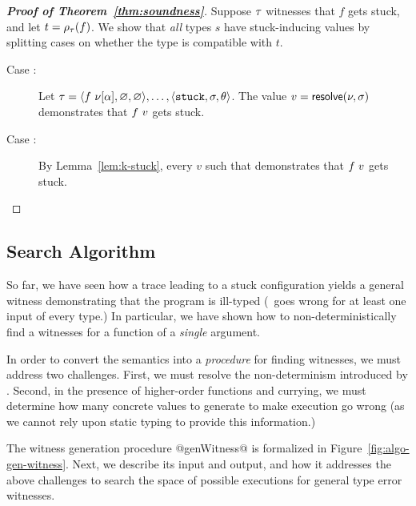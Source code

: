 \begin{proof}[\textbf{Proof of Theorem~\ref{thm:soundness}}]
%
Suppose $\tau$ witnesses that $f$ gets stuck,
and let $t = \rho_{\tau}(f)$.
We show that \emph{all} types $s$ have stuck-inducing
values by splitting cases on whether the type is
compatible with $t$. %
%
\begin{description}
\item [Case :]
  Let $\tau = \langle f\ \nu[\alpha], \varnothing, \varnothing \rangle,\ldots,\langle \mathtt{stuck}, \sigma, \theta \rangle$.
  The value $v = \mathsf{resolve}(\nu, \sigma)$ demonstrates that
  $f\ v$ gets stuck.
\item [Case :] By Lemma~\ref{lem:k-stuck}, every $v$
  such that  demonstrates that $f\ v$ gets stuck.
\end{description}
\end{proof}

\subsection{Search Algorithm}
\label{sec:search-algorithm}
%
So far, we have seen how a trace leading to a stuck configuration yields
a general witness demonstrating that the program is ill-typed (\ie\ goes
wrong for at least one input of every type.)
In particular, we have shown how to non-deterministically find a witnesses
for a function of a \emph{single} argument.

In order to convert the semantics into a \emph{procedure} for finding
witnesses, we must address two challenges.
%
First, we must resolve the non-determinism introduced by \gensym.
%
Second, in the presence of higher-order functions and currying,
we must determine how many concrete values to generate to make
execution go wrong (as we cannot rely upon static typing to
provide this information.)

The witness generation procedure @genWitness@ is formalized in
Figure~\ref{fig:algo-gen-witness}.
%
Next, we describe its input and output, and how it
addresses the above challenges to search the space of possible
executions for general type error witnesses.

